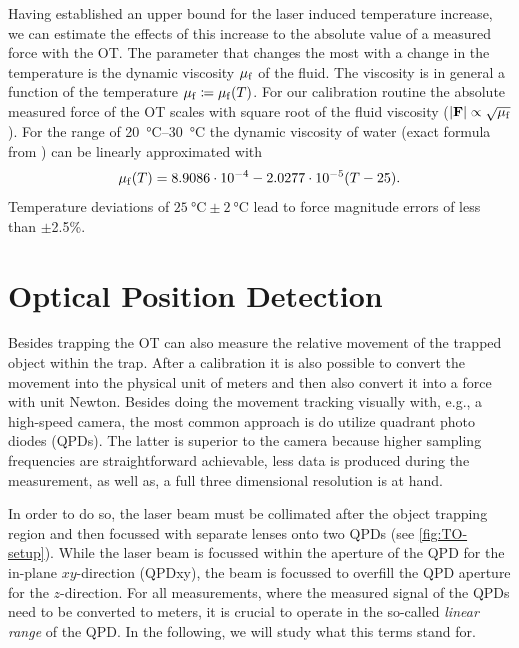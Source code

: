 Having established an upper bound for the laser induced temperature increase, 
we can estimate the effects of this increase to the absolute value of a 
measured force with the OT. The parameter that changes the most with a change 
in the temperature is the dynamic viscosity $\mu_{\mathrm{f}}$ of the fluid. The viscosity 
is in general a function of the temperature $\mu_{\mathrm{f}}\coloneqq\mu_{\mathrm{f}}(T)$. For our 
calibration routine the absolute measured force of the OT scales with square 
root of the fluid viscosity ($\abs{\vb{F}}\propto\sqrt{\mu_{\mathrm{f}}}$). For the 
range of \SIrange{20}{30}{\degreeCelsius} the dynamic viscosity of water (exact 
formula from \cite{Peterman2003}) can be linearly approximated with
\begin{equation}
  \mu_{\mathrm{f}}(T) = 8.9086\cdot 10^{-4} -2.0277\cdot10^{-5} (T-25).
  \label{eq:TO-viscosity}
\end{equation}
Temperature deviations of $\SI{25}{\degreeCelsius}\pm\SI{2}{\degreeCelsius}$ 
lead to force magnitude errors of less than $\pm$2.5\%.

\section{Optical Position Detection\label{sec:TO-QPD}}

Besides trapping the OT can also measure the relative movement of the trapped 
object within the trap. After a calibration it is also possible to convert the 
movement into the physical unit of meters and then also convert it into a force 
with unit Newton. Besides doing the movement tracking visually with, e.g., a 
high-speed camera, the most common approach is do utilize quadrant photo diodes 
(QPDs). The latter is superior to the camera because higher sampling 
frequencies are straightforward achievable, less data is produced during the 
measurement, as well as, a full three dimensional resolution is at hand.

In order to do so, the laser beam must be collimated after the object trapping 
region and then focussed with separate lenses onto two QPDs (see 
\cref{fig:TO-setup}). While the laser beam is focussed within the aperture of 
the QPD for the in-plane $xy$-direction (QPDxy), the beam is focussed to 
overfill the QPD aperture for the $z$-direction. For all measurements, where 
the measured signal of the QPDs need to be converted to meters, it is crucial 
to operate in the so-called \emph{linear range} of the QPD. In the following, 
we will study what this terms stand for.

